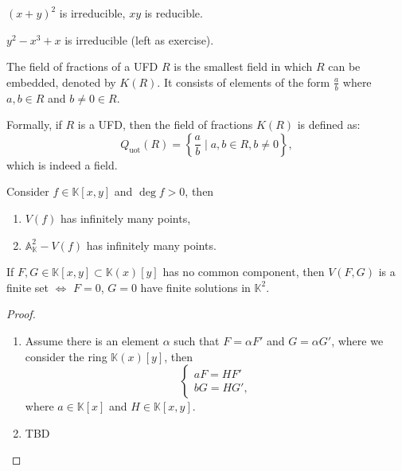 \documentclass[10pt]{article}
\begin{document}
\begin{example}
  $( x + y )^{2}$ is irreducible, $ xy$ is reducible.
\end{example}
\begin{example}
  $ y^{2} - x^{3} + x$ is irreducible (left as exercise).
\end{example}

\begin{definition}
  The field of fractions of a UFD $ R$ is the smallest field in which $ R$ can be embedded, denoted by $ K(R)$.
  It consists of elements of the form $ \frac{a}{b}$ where $ a, b \in R$ and $ b \neq 0 \in R$.

  Formally, if $ R$ is a UFD, then the field of fractions $ K(R)$ is defined as:
  \begin{equation*}
    Q_{\mathrm{uot}}(R) = \left\{ \frac{a}{b} \mid a, b \in R, b \neq 0 \right\},
  \end{equation*}
  which is indeed a field.
\end{definition}

\begin{lemma}
  Consider $ f \in \mathbb{K}[x,y]$ and $ \deg f > 0$, then
  \begin{enumerate}[(1)]
    \item $ V(f)$ has infinitely many points,
    \item $ \mathbb{A}^{2}_{\mathbb{K}} - V(f)$ has infinitely many points.
  \end{enumerate}
\end{lemma}

\begin{theorem}
  If $ F, G \in \mathbb{K}[x,y] \subset \mathbb{K}(x)[y]$ has no common component, then $ V(F,G)$ is a finite set $\Leftrightarrow$ $ F=0$, $ G = 0$ have finite solutions in $ \mathbb{K}^{2}$.
\end{theorem}
\begin{proof}
  \begin{enumerate}[(1)]
    \item Assume there is an element $ \alpha$ such that $ F = \alpha F'$ and $ G = \alpha G'$, where we consider the ring $ \mathbb{K}(x)[y]$, then
      \begin{equation*}
        \begin{cases}
          a F = H F'\\
          b G = H G',
        \end{cases}
      \end{equation*}
      where $ a \in \mathbb{K}[x]$ and $ H \in \mathbb{K}[x,y]$.
    \item TBD
  \end{enumerate}
\end{proof}
\end{document}
